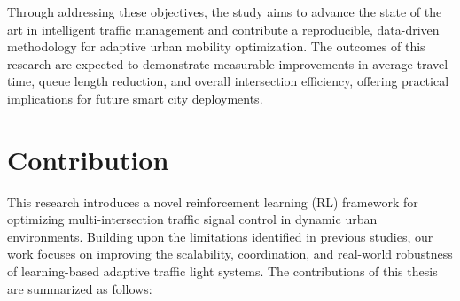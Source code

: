 \documentclass[12pt]{report} %
\begin{document}
Through addressing these objectives, the study aims to advance the state of the art in intelligent traffic management and contribute a reproducible, data-driven methodology for adaptive urban mobility optimization. The outcomes of this research are expected to demonstrate measurable improvements in average travel time, queue length reduction, and overall intersection efficiency, offering practical implications for future smart city deployments.


\section{Contribution}

This research introduces a novel reinforcement learning (RL) framework for optimizing multi-intersection traffic signal control in dynamic urban environments. Building upon the limitations identified in previous studies, our work focuses on improving the scalability, coordination, and real-world robustness of learning-based adaptive traffic light systems. The contributions of this thesis are summarized as follows:
\end{document}

